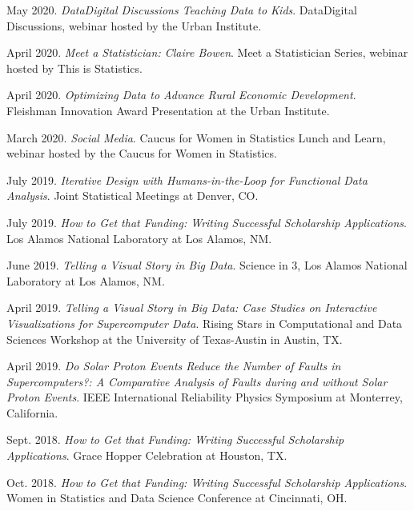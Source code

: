 \documentclass[11pt, letterpaper, roman]{moderncv} %
\begin{document}
\begin{etaremune}[topsep=0pt, itemsep=6pt, partopsep=0pt, parsep=0pt]
    \item May 2020. \textit{Data\@Urban Digital Discussions Teaching Data to Kids}. Data\@Urban Digital Discussions, webinar hosted by the Urban Institute.
    
    \item April 2020. \textit{Meet a Statistician: Claire Bowen}. Meet a Statistician Series, webinar hosted by This is Statistics.
    
    \item April 2020. \textit{Optimizing Data to Advance Rural Economic Development}. Fleishman Innovation Award Presentation at the Urban Institute.
    
    \item March 2020. \textit{Social Media}. Caucus for Women in Statistics Lunch and Learn, webinar hosted by the Caucus for Women in Statistics.
    
    \item July 2019. \textit{Iterative Design with Humans-in-the-Loop for Functional Data Analysis}. Joint Statistical Meetings at Denver, CO. 
    
    \item July 2019. \textit{How to Get that Funding: Writing Successful Scholarship Applications}. Los Alamos National Laboratory at Los Alamos, NM.
    
    \item June 2019. \textit{Telling a Visual Story in Big Data}. Science in 3, Los Alamos National Laboratory at Los Alamos, NM. 
    
    \item April 2019. \textit{Telling a Visual Story in Big Data: Case Studies on Interactive Visualizations for Supercomputer Data}. Rising Stars in Computational and Data Sciences Workshop at the University of Texas-Austin in Austin, TX.
    
    \item April 2019. \textit{Do Solar Proton Events Reduce the Number of Faults in Supercomputers?: A Comparative Analysis of Faults during and without Solar Proton Events}. IEEE International Reliability Physics Symposium at Monterrey, California.
    
    \item Sept. 2018. \textit{How to Get that Funding: Writing Successful Scholarship Applications}. Grace Hopper Celebration at Houston, TX.
    
    \item Oct. 2018. \textit{How to Get that Funding: Writing Successful Scholarship Applications}. Women in Statistics and Data Science Conference at Cincinnati, OH.
    

\end{etaremune}
\end{document}
